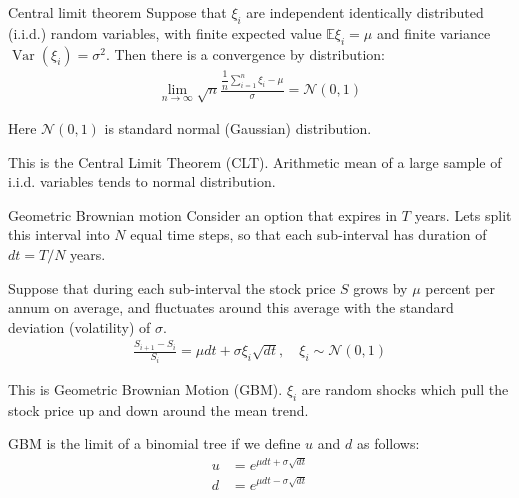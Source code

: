\documentclass{beamer}
\begin{document}
\begin{frame}{Central limit theorem}
\justify
Suppose that $\xi_i$ are independent identically distributed (i.i.d.) random variables, with finite expected value $\mathbb{E}\xi_i=\mu$ and finite variance $\operatorname{Var}(\xi_i) = \sigma^2$. Then there is a convergence by distribution:
\begin{align*}
\lim_{n \to \infty} \sqrt{n}\frac{\dfrac{1}{n}\sum\limits_{i=1}^{n}\xi_i - \mu}{\sigma} = \mathcal{N}(0, 1)
\end{align*}

\justify
Here $\mathcal{N}(0, 1)$ is standard normal (Gaussian) distribution.

\justify
This is the Central Limit Theorem (CLT). Arithmetic mean of a large sample of i.i.d. variables tends to normal distribution.
\end{frame}



\begin{frame}{Geometric Brownian motion}
\justify
Consider an option that expires in $T$ years. Lets split this interval into $N$ equal time steps, so that each sub-interval has duration of $dt = T/N$ years.

\justify
Suppose that during each sub-interval the stock price $S$ grows by $\mu$ percent per annum on average, and fluctuates around this average with the standard deviation (volatility) of $\sigma$.
\begin{align*}
\frac{S_{i+1} - S_i}{S_i} = \mu dt + \sigma\xi_i\sqrt{dt}, \quad \xi_i \sim \mathcal{N}(0, 1)
\end{align*}

\justify
This is Geometric Brownian Motion (GBM). $\xi_i$ are random shocks which pull the stock price up and down around the mean trend. 

\justify
GBM is the limit of a binomial tree if we define $u$ and $d$ as follows:
\begin{align*}
u &= e^{\mu dt + \sigma\sqrt{dt}} \\
d &= e^{\mu dt - \sigma\sqrt{dt}}
\end{align*}
\end{frame}



\newcommand{\plotBrownianMotion}[2] {
	
	\addplot[
		color = #2,
		mark = none,
		thick
	]
	table[
		x=t,
		y=s,
		col sep=comma
	]
	{#1};
	
	\addplot[
		color = #2,
		mark = none,
		thick,
		dashed,
		forget plot
	] 
	table[
		x=t,
		y=trend,
		col sep=comma
	]
	{#1};
}
\end{document}
